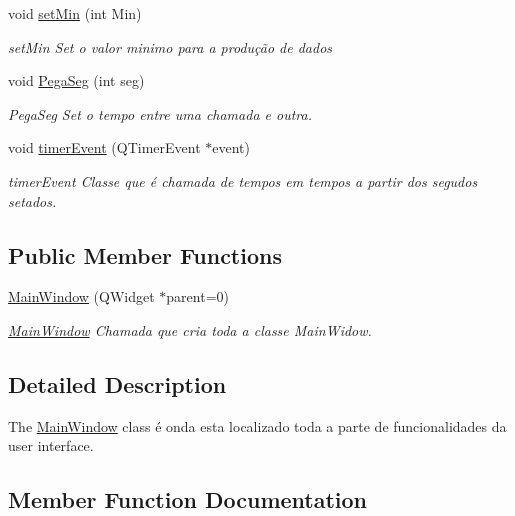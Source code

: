 \begin{DoxyCompactItemize}
void \mbox{\hyperlink{class_main_window_a911cc55fc2d492c44679834146faa77f}{set\+Min}} (int Min)
\begin{DoxyCompactList}\small\item\em set\+Min Set o valor minimo para a produção de dados \end{DoxyCompactList}\item 
void \mbox{\hyperlink{class_main_window_a4fa75cec1aa7eeca94028dbcb58bbe14}{Pega\+Seg}} (int seg)
\begin{DoxyCompactList}\small\item\em Pega\+Seg Set o tempo entre uma chamada e outra. \end{DoxyCompactList}\item 
void \mbox{\hyperlink{class_main_window_aaa425b1554af3c1f58cc70b4815082ae}{timer\+Event}} (Q\+Timer\+Event $\ast$event)
\begin{DoxyCompactList}\small\item\em timer\+Event Classe que é chamada de tempos em tempos a partir dos segudos setados. \end{DoxyCompactList}\end{DoxyCompactItemize}
\subsection*{Public Member Functions}
\begin{DoxyCompactItemize}
\item 
\mbox{\label{class_main_window_a8b244be8b7b7db1b08de2a2acb9409db}} 
\mbox{\hyperlink{class_main_window_a8b244be8b7b7db1b08de2a2acb9409db}{Main\+Window}} (Q\+Widget $\ast$parent=0)
\begin{DoxyCompactList}\small\item\em \mbox{\hyperlink{class_main_window}{Main\+Window}} Chamada que cria toda a classe Main\+Widow. \end{DoxyCompactList}\end{DoxyCompactItemize}


\subsection{Detailed Description}
The \mbox{\hyperlink{class_main_window}{Main\+Window}} class é onda esta localizado toda a parte de funcionalidades da user interface. 

\subsection{Member Function Documentation}
\mbox{\label{class_main_window_a4fa75cec1aa7eeca94028dbcb58bbe14}} 
